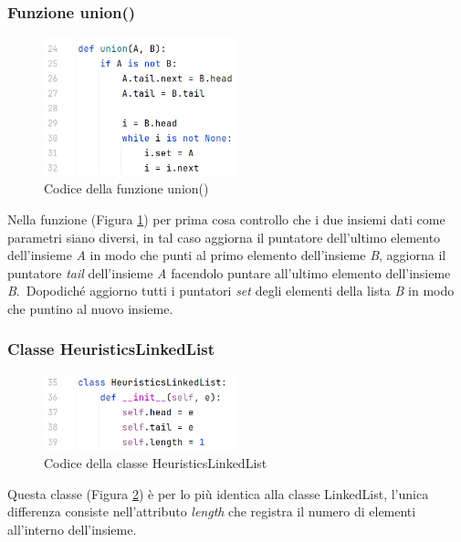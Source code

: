 \documentclass[12pt]{article}
\begin{document}
\subsubsection{Funzione union()}
\begin{figure}[h]
    \centering
    \includegraphics[width=0.5\textwidth]{images/linked_list_code_images/ll_union.png}
    \caption{Codice della funzione union()}
    \label{fig:ll_union}
\end{figure}
Nella funzione (Figura \ref{fig:ll_union}) per prima cosa controllo che i due insiemi dati come parametri siano diversi, in tal caso aggiorna il puntatore dell'ultimo elemento dell'insieme \textit{A} in modo che punti al primo elemento dell'insieme \textit{B}, aggiorna il puntatore \textit{tail} dell'insieme \textit{A} facendolo puntare all'ultimo elemento dell'insieme \textit{B}.\
Dopodiché aggiorno tutti i puntatori \textit{set} degli elementi della lista \textit{B} in modo che puntino al nuovo insieme.

\subsubsection{Classe HeuristicsLinkedList}
\begin{figure}[h]
    \centering
    \includegraphics[width=0.5\textwidth]{images/linked_list_code_images/llh_class.png}
    \caption{Codice della classe HeuristicsLinkedList}
    \label{fig:llh_class}
\end{figure}
Questa classe (Figura \ref{fig:llh_class}) è per lo più identica alla classe LinkedList, l'unica differenza consiste nell'attributo \textit{length} che registra il numero di elementi all'interno dell'insieme.
\end{document}
